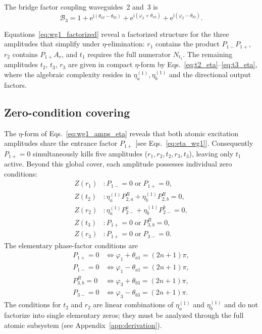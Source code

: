 \documentclass[aps,pra,reprint,superscriptaddress,nofootinbib,longbibliography,floatfix]{revtex4-2}
\newcommand{\ii}{\mathrm{i}}
\newcommand{\ee}{\mathrm{e}}
\newcommand{\ph}{\varphi}
\newcommand{\thaone}{\theta_{a1}}
\newcommand{\thatwo}{\theta_{a2}}
\newcommand{\thbtwo}{\theta_{b2}}
\newcommand{\thbthree}{\theta_{b3}}
\newcommand{\Bthree}{\mathcal{B}_3}
\newcommand{\Poneplus}{P_{1+}}
\newcommand{\Poneminus}{P_{1-}}
\begin{document}
The bridge factor coupling waveguides~2 and~3 is
\begin{equation}
\Bthree = 1 + \ee^{\ii(\thatwo-\thbtwo)}
+ \ee^{\ii(\ph_2+\thatwo)} + \ee^{\ii(\ph_2-\thbtwo)}.
\label{eq:B3}
\end{equation}

Equations~\eqref{eq:wg1_factorized} reveal a factorized structure for the three amplitudes that simplify under $\eta$-elimination: $r_1$ contains the product $\Poneminus\Poneplus$, $r_2$ contains $\Poneplus A_r$, and $t_1$ requires the full numerator $N_{t_1}$. The remaining amplitudes $t_2$, $t_3$, $r_3$ are given in compact $\eta$-form by Eqs.~\eqref{eq:t2_eta}--\eqref{eq:t3_eta}, where the algebraic complexity resides in $\eta_a^{(1)},\eta_b^{(1)}$ and the directional output factors.

\subsection{Zero-condition covering}

The $\eta$-form of Eqs.~\eqref{eq:wg1_amps_eta} reveals that both atomic excitation amplitudes share the entrance factor $\Poneplus$ [see Eqs.~\eqref{eq:eta_wg1}]. Consequently $\Poneplus=0$ simultaneously kills five amplitudes ($r_1,r_2,t_2,r_3,t_3$), leaving only $t_1$ active. Beyond this global cover, each amplitude possesses individual zero conditions:
\begin{align}
Z(r_1)&: \Poneminus=0 \;\text{or}\; \Poneplus=0,\\
Z(t_2)&: \eta_a^{(1)}P_{2,a}^{R} + \eta_b^{(1)}P_{2,b}^{R}=0,\\
Z(r_2)&: \eta_a^{(1)}P_{2-}^{a} + \eta_b^{(1)}P_{2-}^{b}=0,\\
Z(t_3)&: \Poneplus=0 \;\text{or}\; P_{3,b}^{R}=0,\\
Z(r_3)&: \Poneplus=0 \;\text{or}\; P_{3-}=0.
\end{align}
The elementary phase-factor conditions are
\begin{subequations}
\begin{align}
\Poneplus=0 &\Longleftrightarrow \ph_1+\thaone = (2n+1)\pi,\\
\Poneminus=0 &\Longleftrightarrow \ph_1-\thaone = (2n+1)\pi,\\
P_{3,b}^{R}=0 &\Longleftrightarrow \ph_3+\thbthree = (2n+1)\pi,\\
P_{3-}=0 &\Longleftrightarrow \ph_3-\thbthree = (2n+1)\pi.
\end{align}
\end{subequations}
The conditions for $t_2$ and $r_2$ are linear combinations of $\eta_a^{(1)}$ and $\eta_b^{(1)}$ and do not factorize into single elementary zeros; they must be analyzed through the full atomic subsystem (see Appendix~\ref{app:derivation}).
\end{document}
